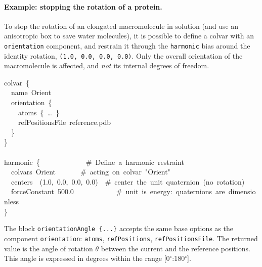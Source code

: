 \paragraph*{Example: stopping the rotation of a protein.}  To stop the
rotation of an elongated macromolecule in solution (and use an
anisotropic box to save water molecules), it is possible to define a
colvar with an \texttt{orientation} component, and restrain it through
the \texttt{harmonic} bias around the identity rotation, \texttt{(1.0,
  0.0, 0.0, 0.0)}.  Only the overall orientation of the macromolecule
is affected, and \emph{not} its internal degrees of freedom.  

\begin{cvexampleinput}
\-colvar~\{\\
\-~~name~Orient\\
\-~~orientation~\{\\
\-~~~~atoms~\{~\ldots~\}\\
\-~~~~refPositionsFile~reference.pdb\\
\-~~\}\\
\-\}\\
\-\\
\-harmonic~\{~~~~~~~~~~~~~\#~Define~a~harmonic~restraint\\
\-~~colvars~Orient~~~~~~~\#~acting~on~colvar~"Orient"\\
\-~~centers~~(1.0,~0.0,~0.0,~0.0)~~\#~center~the~unit~quaternion~(no~rotation)\\
\-~~forceConstant~500.0~~~~~~~~~~~~\#~unit~is~energy:~quaternions~are~dimensionless\\
\-\}\\
\end{cvexampleinput}



The block \texttt{orientationAngle~\{...\}} accepts the same base options as
the component \texttt{orientation}: \texttt{atoms}, \texttt{refPositions}, \texttt{refPositionsFile}.
The returned value is the angle of rotation $\theta$ between the current and the reference positions.
This angle is expressed in degrees within the range [0$^{\circ}$:180$^{\circ}$].

